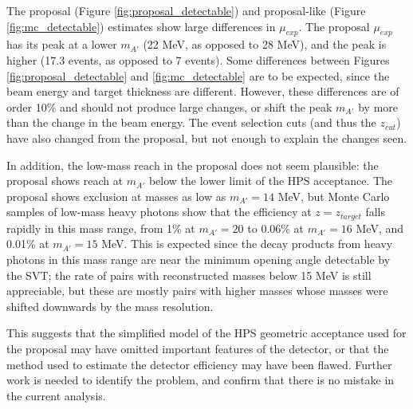 The proposal (Figure \ref{fig:proposal_detectable}) and proposal-like (Figure \ref{fig:mc_detectable}) estimates show large differences in $\mu_{exp}$.
The proposal $\mu_{exp}$ has its peak at a lower $m_{A'}$ (22 MeV, as opposed to 28 MeV), and the peak is higher (17.3 events, as opposed to 7 events).
Some differences between Figures \ref{fig:proposal_detectable} and \ref{fig:mc_detectable} are to be expected, since the beam energy and target thickness are different.
However, these differences are of order 10\% and should not produce large changes, or shift the peak $m_{A'}$ by more than the change in the beam energy.
The event selection cuts (and thus the $z_{cut}$) have also changed from the proposal, but not enough to explain the changes seen.

In addition, the low-mass reach in the proposal does not seem plausible: the proposal shows reach at $m_{A'}$ below the lower limit of the HPS acceptance.
The proposal shows exclusion at masses as low as $m_{A'}=14$ MeV, but Monte Carlo samples of low-mass heavy photons show that the efficiency at $z=z_{target}$ falls rapidly in this mass range, from 1\% at $m_{A'}=20$ to 0.06\% at $m_{A'}=16$ MeV, and 0.01\% at $m_{A'}=15$ MeV.
This is expected since the decay products from heavy photons in this mass range are near the minimum opening angle detectable by the SVT; the rate of pairs with reconstructed masses below 15 MeV is still appreciable, but these are mostly pairs with higher masses whose masses were shifted downwards by the mass resolution.

This suggests that the simplified model of the HPS geometric acceptance used for the proposal may have omitted important features of the detector, or that the method used to estimate the detector efficiency may have been flawed.
Further work is needed to identify the problem, and confirm that there is no mistake in the current analysis.


